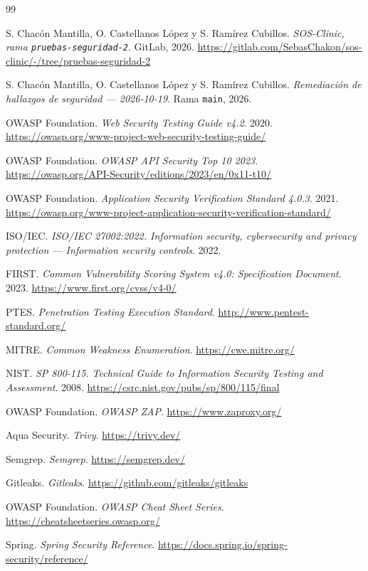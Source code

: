 
\begin{thebibliography}{99}
\small

S. Chacón Mantilla, O. Castellanos López y S. Ramírez Cubillos.
\emph{SOS-Clinic, rama \texttt{pruebas-seguridad-2}}. GitLab, 2026.
\url{https://gitlab.com/SebasChakon/sos-clinic/-/tree/pruebas-seguridad-2}

S. Chacón Mantilla, O. Castellanos López y S. Ramírez Cubillos.
\emph{Remediación de hallazgos de seguridad --- 2026-10-19}. Rama
\texttt{main}, 2026. 

OWASP Foundation. \emph{Web Security Testing Guide v4.2}. 2020.
\url{https://owasp.org/www-project-web-security-testing-guide/}

OWASP Foundation. \emph{OWASP API Security Top 10 2023}.
\url{https://owasp.org/API-Security/editions/2023/en/0x11-t10/}

OWASP Foundation. \emph{Application Security Verification Standard 4.0.3}. 2021.
\url{https://owasp.org/www-project-application-security-verification-standard/}

ISO/IEC. \emph{ISO/IEC 27002:2022. Information security, cybersecurity and
privacy protection --- Information security controls}. 2022.

FIRST. \emph{Common Vulnerability Scoring System v4.0: Specification Document}.
2023. \url{https://www.first.org/cvss/v4-0/}

PTES. \emph{Penetration Testing Execution Standard}.
\url{http://www.pentest-standard.org/}

MITRE. \emph{Common Weakness Enumeration}.
\url{https://cwe.mitre.org/}

NIST. \emph{SP 800-115. Technical Guide to Information Security Testing and
Assessment}. 2008. \url{https://csrc.nist.gov/pubs/sp/800/115/final}

OWASP Foundation. \emph{OWASP ZAP}.
\url{https://www.zaproxy.org/}

Aqua Security. \emph{Trivy}.
\url{https://trivy.dev/}

Semgrep. \emph{Semgrep}.
\url{https://semgrep.dev/}

Gitleaks. \emph{Gitleaks}.
\url{https://github.com/gitleaks/gitleaks}

OWASP Foundation. \emph{OWASP Cheat Sheet Series}.
\url{https://cheatsheetseries.owasp.org/}

Spring. \emph{Spring Security Reference}.
\url{https://docs.spring.io/spring-security/reference/}

\end{thebibliography}

